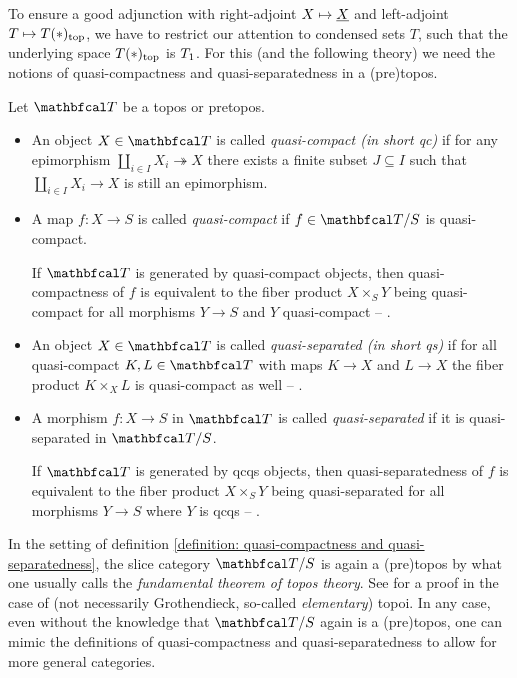 To ensure a good adjunction with right-adjoint $X\mapsto\underline{X}$ and left-adjoint $T\mapsto {T(\ast)_\mathrm{top}}$, we have to restrict our attention to condensed sets $T$, such that the underlying space ${T(\ast)_\mathrm{top}}$ is ${T_1}$. For this (and the following theory) we need the notions of quasi-compactness and quasi-separatedness in a (pre)topos. 
\begin{definition}
	\label{definition: quasi-compactness and quasi-separatedness}
	
	Let $\category T$ be a topos or pretopos.
	\begin{itemize}
		\item
		An object $X\in \category T$ is called \emph{quasi-compact (in short qc)} if for any epimorphism $\coprod_{i\in I} X_i \twoheadrightarrow X$ there exists a finite subset $J\subseteq I$ such that $\coprod_{i\in I} X_i \to X$ is still an epimorphism.
		
		\item
		A map $f\colon X\to S$ is called \emph{quasi-compact} if $f\in \category T/S$ is quasi-compact.
		
		If $\category T$ is generated by quasi-compact objects, then quasi-compactness of $f$ is equivalent to the fiber product $X\times_S Y$ being quasi-compact for all morphisms $Y\to S$ and $Y$ quasi-compact -- .
		
		\item
		An object $X\in \category T$ is called \emph{quasi-separated (in short qs)} if for all quasi-compact $K, L\in \category T$ with maps $K\to X$ and $L\to X$ the fiber product $K\times_X L$ is quasi-compact as well -- .
		
		\item
		A morphism $f\colon X\to S$ in $\category T$ is called \emph{quasi-separated} if it is quasi-separated in $\category T/S$.
		
		If $\category T$ is generated by qcqs objects, then quasi-separatedness of $f$ is equivalent to the fiber product $X\times_S Y$ being quasi-separated for all morphisms $Y\to S$ where $Y$ is qcqs -- .
	\end{itemize}
\end{definition}

\begin{remark}
	In the setting of definition \ref{definition: quasi-compactness and quasi-separatedness}, the slice category $\category T/S$ is again a (pre)topos by what one usually calls the \emph{fundamental theorem of topos theory}. See \eg \cite[A2.3]{elephant1} for a proof in the case of (not necessarily Grothendieck, so-called \emph{elementary}) topoi. In any case, even without the knowledge that $\category T/S$ again is a (pre)topos, one can mimic the definitions of quasi-compactness and quasi-separatedness to allow for more general categories.
\end{remark}

